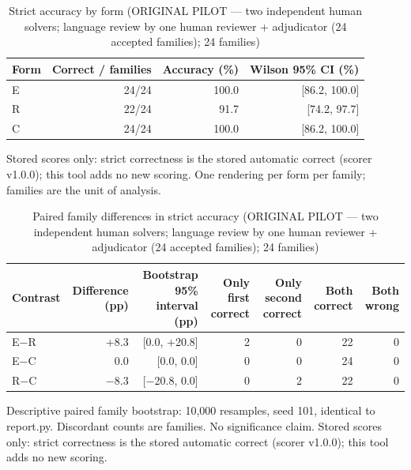 \begin{table}[t]
\centering
\small
\caption{Strict accuracy by form (ORIGINAL PILOT --- two independent human solvers; language review by one human reviewer + adjudicator (24 accepted families); 24 families)}
\label{tab:pilotorig-Qwen3-4B-accuracy}
\begin{tabular}{lrrr}
\toprule
Form & Correct / families & Accuracy (\%) & Wilson 95\% CI (\%) \\
\midrule
E & 24/24 & 100.0 & [86.2, 100.0] \\
R & 22/24 & 91.7 & [74.2, 97.7] \\
C & 24/24 & 100.0 & [86.2, 100.0] \\
\bottomrule
\end{tabular}
\par\smallskip
\parbox{\linewidth}{\footnotesize Stored scores only: strict correctness is the stored automatic correct (scorer v1.0.0); this tool adds no new scoring. One rendering per form per family; families are the unit of analysis.}
\end{table}

\begin{table}[t]
\centering
\small
\caption{Paired family differences in strict accuracy (ORIGINAL PILOT --- two independent human solvers; language review by one human reviewer + adjudicator (24 accepted families); 24 families)}
\label{tab:pilotorig-Qwen3-4B-paired}
\begin{tabular}{lrrrrrr}
\toprule
Contrast & Difference (pp) & Bootstrap 95\% interval (pp) & Only first correct & Only second correct & Both correct & Both wrong \\
\midrule
E$-$R & +8.3 & [0.0, +20.8] & 2 & 0 & 22 & 0 \\
E$-$C & 0.0 & [0.0, 0.0] & 0 & 0 & 24 & 0 \\
R$-$C & $-$8.3 & [$-$20.8, 0.0] & 0 & 2 & 22 & 0 \\
\bottomrule
\end{tabular}
\par\smallskip
\parbox{\linewidth}{\footnotesize Descriptive paired family bootstrap: 10,000 resamples, seed 101, identical to report.py. Discordant counts are families. No significance claim. Stored scores only: strict correctness is the stored automatic correct (scorer v1.0.0); this tool adds no new scoring.}
\end{table}

